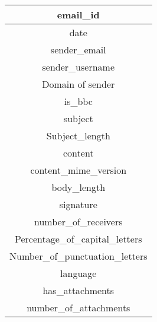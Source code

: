 \begin{center}
\begin{tabular}{|c|}
\hline 
email\_id\tabularnewline
\hline
date\tabularnewline
\hline 
sender\_email\tabularnewline
\hline 
sender\_username\tabularnewline
\hline 
Domain of sender\tabularnewline
\hline 
is\_bbc\tabularnewline
\hline 
subject\tabularnewline
\hline 
Subject\_length\tabularnewline
\hline 
content\tabularnewline
\hline 
content\_mime\_version\tabularnewline
\hline 
body\_length\tabularnewline
\hline 
signature\tabularnewline
\hline 
number\_of\_receivers\tabularnewline
\hline 
Percentage\_of\_capital\_letters\tabularnewline
\hline 
Number\_of\_punctuation\_letters\tabularnewline
\hline 
language\tabularnewline
\hline 
has\_attachments\tabularnewline
\hline 
number\_of\_attachments\tabularnewline
\hline
\end{tabular}
\end{center}

\newpage





